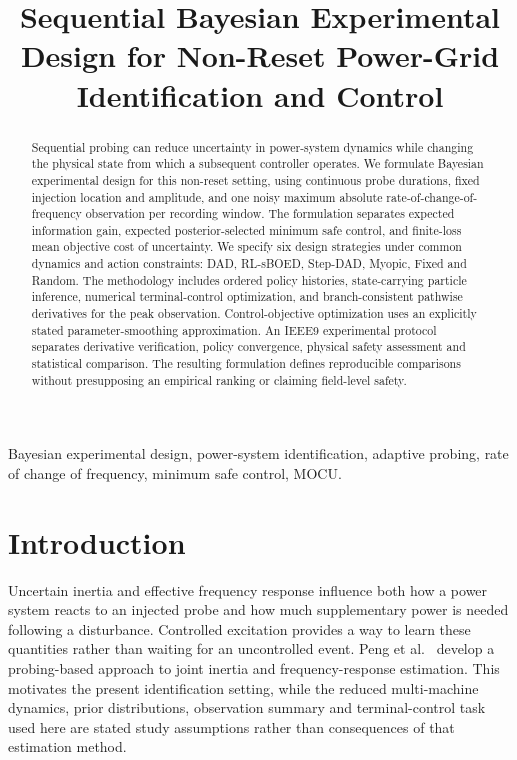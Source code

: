 \documentclass[journal]{IEEEtran}
\title{Sequential Bayesian Experimental Design for Non-Reset Power-Grid Identification and Control}
\author{}
\date{}
\begin{document}
\maketitle
\begin{abstract}
Sequential probing can reduce uncertainty in power-system dynamics while
changing the physical state from which a subsequent controller operates.
We formulate Bayesian experimental design for this non-reset setting, using
continuous probe durations, fixed injection location and amplitude, and one
noisy maximum absolute rate-of-change-of-frequency observation per recording
window. The formulation separates expected information gain, expected
posterior-selected minimum safe control, and finite-loss mean objective cost
of uncertainty. We specify six design strategies under common dynamics and
action constraints: DAD, RL-sBOED, Step-DAD, Myopic, Fixed and Random.
The methodology includes ordered policy histories, state-carrying particle
inference, numerical terminal-control optimization, and branch-consistent
pathwise derivatives for the peak observation. Control-objective optimization
uses an explicitly stated parameter-smoothing approximation. An IEEE9
experimental protocol separates derivative verification, policy convergence,
physical safety assessment and statistical comparison. The resulting formulation
defines reproducible comparisons without presupposing an empirical
ranking or claiming field-level safety.
\end{abstract}
\begin{IEEEkeywords}
Bayesian experimental design, power-system identification, adaptive probing,
rate of change of frequency, minimum safe control, MOCU.
\end{IEEEkeywords}

\section{Introduction}
\label{sec:introduction}
Uncertain inertia and effective frequency response influence both how a power
system reacts to an injected probe and how much supplementary power is needed
following a disturbance. Controlled excitation provides a way to learn these
quantities rather than waiting for an uncontrolled event. Peng et
al.~\cite{peng2024probing} develop a probing-based approach to joint inertia
and frequency-response estimation. This motivates the present identification
setting, while the reduced multi-machine dynamics, prior distributions,
observation summary and terminal-control task used here are stated study
assumptions rather than consequences of that estimation method.
\end{document}
